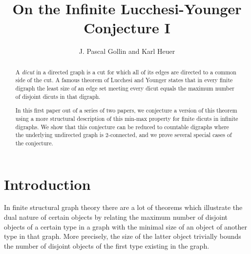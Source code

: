 \documentclass[reqno, 12pt]{amsart}
\numberwithin{equation}{section}
\numberwithin{figure}{section}
\theoremstyle{plain}
\theoremstyle{definition}
\begin{document}
\author{J. Pascal Gollin and Karl Heuer}
\address{J. Pascal Gollin, Discrete Mathematics Group, Institute for Basic Science (IBS), 55, Expo-ro, Yuseong-gu, 34126 Daejeon, Republic of Korea}
\address{Karl Heuer, Institute of Software Engineering and Theoretical Computer Science, Technische Universit\"{a}t Berlin, Ernst-Reuter-Platz 7, 10587 Berlin, Germany}



\title[]{On the Infinite Lucchesi-Younger Conjecture I}

\begin{abstract}
    A \emph{dicut} in a directed graph is a cut for which all of its edges are directed to a common side of the cut. 
    A famous theorem of Lucchesi and Younger states that in every finite digraph the least size of an edge set meeting every dicut equals the maximum number of disjoint dicuts in that digraph.

    In this first paper out of a series of two papers, we conjecture a version of this theorem using a more structural description of this min-max property for finite dicuts in infinite digraphs. 
    We show that this conjecture can be reduced to countable digraphs where the underlying undirected graph is $2$-connected, and we prove several special cases of the conjecture.
\end{abstract}

\maketitle

\setcounter{footnote}{1}




\section{Introduction}

In finite structural graph theory there are a lot of theorems which illustrate the dual nature of certain objects 
by relating the maximum number of disjoint objects of a certain type in a graph with the minimal size of an object of another type in that graph.
More precisely, the size of the latter object trivially bounds the number of disjoint objects of the first type existing in the graph.
\end{document}
